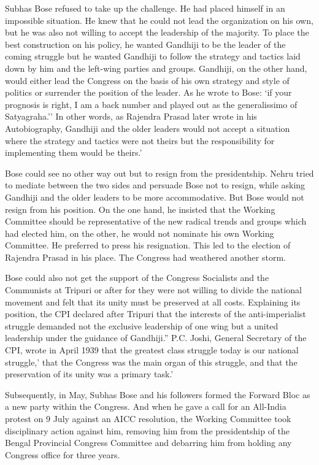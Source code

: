 Subhas Bose refused to take up the challenge. He had placed himself in an impossible situation. He knew that he could not lead the organization on his own, but he was also not willing to accept the leadership of the majority. To place the best construction on his policy, he wanted Gandhiji to be the leader of the coming struggle but he wanted Gandhiji to follow the strategy and tactics laid down by him and the left-wing parties and groups. Gandhiji, on the other hand, would either lead the Congress on the basis of his own strategy and style of politics or surrender the position of the leader. As he wrote to Bose: `if your prognosis is right, I am a back number and played out as the generalissimo of Satyagraha.'' In other words, as Rajendra Prasad later wrote in his Autobiography, Gandhiji and the older leaders would not accept a situation where the strategy and tactics were not theirs but the responsibility for implementing them would be theirs.' 

Bose could see no other way out but to resign from the presidentship. Nehru tried to mediate between the two sides and persuade Bose not to resign, while asking Gandhiji and the older leaders to be more accommodative. But Bose would not resign from his position. On the one hand, he insisted that the Working Committee should be representative of the new radical trends and groups which had elected him, on the other, he would not nominate his own Working Committee. He preferred to press his resignation. This led to the election of Rajendra Prasad in his place. The Congress had weathered another storm. 

Bose could also not get the support of the Congress Socialists and the Communists at Tripuri or after for they were not willing to divide the national movement and felt that its unity must be preserved at all costs. Explaining its position, the CPI declared after Tripuri that the interests of the anti-imperialist struggle demanded not the exclusive leadership of one wing but a united leadership under the guidance of Gandhiji.'' P.C. Joshi, General Secretary of the CPI, wrote in April 1939 that the greatest class struggle today is our national struggle,' that the Congress was the main organ of this struggle, and that the preservation of its unity was a primary task.' 

Subsequently, in May, Subhas Bose and his followers formed the Forward Bloc as a new party within the Congress. And when he gave a call for an All-India protest on 9 July against an AICC resolution, the Working Committee took disciplinary action against him, removing him from the presidentship of the Bengal Provincial Congress Committee and debarring him from holding any Congress office for three years. 

